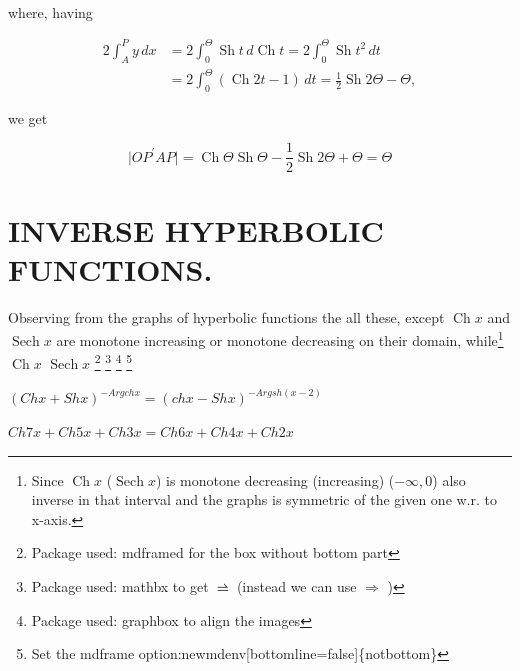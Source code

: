 \documentclass[11pt]{amsbook}
\begin{document}
    $ $\\
    \noindent
    where, having 
    
    \begin{align*}
        2 \int_A^P y \,dx &= 2 \int_0^\Theta \operatorname{Sh}t \,d\operatorname{Ch}t = 2 \int_0^\Theta \operatorname{Sh}t^2 \,dt
        \\
        &= 2 \int_0^\Theta (\operatorname{Ch}2t - 1) \,dt = \frac{1}{2} \operatorname{Sh}2\Theta - \Theta ,
    \end{align*}
    
    \noindent
    we get 
    
    \[
        |OP^\prime AP \vert = \operatorname{Ch}\Theta \operatorname{Sh}\Theta - \frac{1}{2} \operatorname{Sh}2\Theta + \Theta = \Theta
    \]
    
    \section{INVERSE HYPERBOLIC FUNCTIONS.}
    
    Observing from the graphs of hyperbolic functions the all these, except $\operatorname{Ch}x$ and $\operatorname{Sech} x$ are monotone increasing or monotone decreasing on their domain, while\footnote{Since $\operatorname{Ch} x$ ($\operatorname{Sech} x$) is monotone decreasing (increasing) ($-\infty , 0$) also inverse in that interval and the graphs is symmetric of the given one w.r. to x-axis.} $\operatorname{Ch}x$ $\operatorname{Sech} x$
\footnote{Package used: mdframed for the box without bottom part}
\footnote{Package used: mathbx to get $\rightbarharpoon$ (instead we can use $\Rightarrow$ )}
\footnote{Package used: graphbox to align the images}
\footnote{Set the mdframe option:newmdenv[bottomline=false]\{notbottom\}}

\begin{hEnumerateArabic}
    \item[]
        \begin{hEnumerateAlpha}
            \item \( { ( Ch x + Sh x )}^{- Argch x} = { ( ch x - Sh x )}^{- Argsh (x-2)}  \)
            \item \( Ch 7x + Ch 5x + Ch 3x = Ch 6x + Ch 4x + Ch 2x \)
        \end{hEnumerateAlpha}
\end{hEnumerateArabic}
\end{document}
